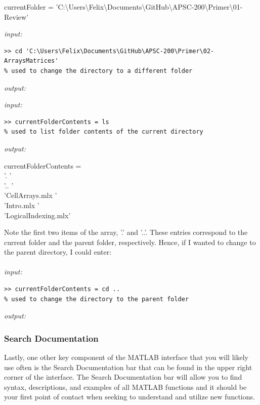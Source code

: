 \documentclass[../MATLAB_Primer.tex]{subfiles}
\begin{document}
\begin{center}
    currentFolder = 'C:\textbackslash Users\textbackslash Felix\textbackslash Documents\textbackslash GitHub\textbackslash APSC-200\textbackslash Primer\textbackslash 01-Review'
\end{center}

\textit{input:}
\begin{lstlisting}[frame=single]
>> cd 'C:\Users\Felix\Documents\GitHub\APSC-200\Primer\02-ArraysMatrices' 
% used to change the directory to a different folder
\end{lstlisting}

\textit{output:}

\begin{center}
    
\end{center}

\textit{input:}
\begin{lstlisting}[frame=single]
>> currentFolderContents = ls 
% used to list folder contents of the current directory
\end{lstlisting}

\textit{output:}

\begin{center}
    currentFolderContents =\\
    '.                  '\\
    '..                 '\\
    'CellArrays.mlx     '\\
    'Intro.mlx          '\\
    'LogicalIndexing.mlx'\\
\end{center}
Note the first two items of the array, '.' and '..'. These entries correspond to the current folder and the parent folder, respectively. Hence, if I wanted to change to the parent directory, I could enter:
\\ \\
\textit{input:}
\begin{lstlisting}[frame=single]
>> currentFolderContents = cd .. 
% used to change the directory to the parent folder
\end{lstlisting}

\textit{output:}

\begin{center}
    
\end{center}

\subsubsection{Search Documentation}
    Lastly, one other key component of the MATLAB interface that you will likely use often is the Search Documentation bar that can be found in the upper right corner of the interface. The Search Documentation bar will allow you to find syntax, descriptions, and examples of all MATLAB functions and it should be your first point of contact when seeking to understand and utilize new functions.
    
\end{document}
